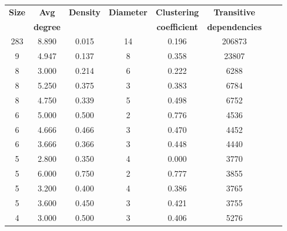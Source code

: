 \begin{table}[ht!]
    \small
    \begin{tabular}{|c|c|c|c|c|c|c|c|}
        \hline
        \textbf{Size} & \textbf{Avg}    & \textbf{Density} & \textbf{Diameter} & \textbf{Clustering}  & \textbf{Transitive}   \\
                      & \textbf{degree} &                  &                   & \textbf{coefficient} & \textbf{dependencies} \\
        \hline
        283           & 8.890           & 0.015            & 14                & 0.196                & 206873                \\
        9             & 4.947           & 0.137            & 8                 & 0.358                & 23807                 \\
        8             & 3.000           & 0.214            & 6                 & 0.222                & 6288                  \\
        8             & 5.250           & 0.375            & 3                 & 0.383                & 6784                  \\
        8             & 4.750           & 0.339            & 5                 & 0.498                & 6752                  \\
        6             & 5.000           & 0.500            & 2                 & 0.776                & 4536                  \\
        6             & 4.666           & 0.466            & 3                 & 0.470                & 4452                  \\
        6             & 3.666           & 0.366            & 3                 & 0.448                & 4440                  \\
        5             & 2.800           & 0.350            & 4                 & 0.000                & 3770                  \\
        5             & 6.000           & 0.750            & 2                 & 0.777                & 3855                  \\
        5             & 3.200           & 0.400            & 4                 & 0.386                & 3765                  \\
        5             & 3.600           & 0.450            & 3                 & 0.421                & 3755                  \\
        4             & 3.000           & 0.500            & 3                 & 0.406                & 5276                  \\

\end{tabular}
\end{table}
